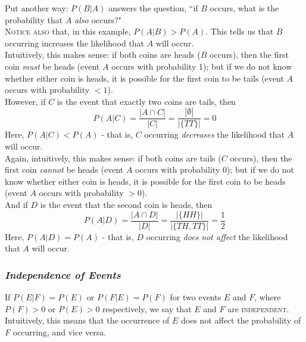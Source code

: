 \documentclass{article}
\begin{document}
Put another way: $P(B|A)$ answers the question, ``if $B$ occurs, what is the probability that $A$ \textit{also} occurs?"\\[1em]
\textsc{Notice also} that, in this example, $P(A|B)>P(A)$. This tells us that $B$ occurring increases the likelihood that $A$ will occur.\\
Intuitively, this makes sense: if both coins are heads ($B$ occurs), then the first coin \textit{must} be heads (event $A$ occurs with probability 1); but if we do not know whether either coin is heads, it is possible for the first coin to be tails (event $A$ occurs with probability $<1$).\\[1ex]
However, if $C$ is the event that exactly two coins are tails, then
\begin{equation*}
P(A|C)=\dfrac{|A\cap C|}{|C|}=\frac{|\emptyset|}{|\{TT\}|}=0
\end{equation*}
Here, $P(A|C)<P(A)$ - that is, $C$ occurring \textit{decreases} the likelihood that $A$ will occur.\\
Again, intuitively, this makes sense: if both coins are tails ($C$ occurs), then the first coin \textit{cannot} be heads (event $A$ occurs with probability 0); but if we do not know whether either coin is heads, it is possible for the first coin to be heads (event $A$ occurs with probability $>0$).\\[1ex]
And if $D$ is the event that the second coin is heads, then
\begin{equation*}
P(A|D)=\dfrac{|A\cap D|}{|D|}=\frac{|\{HH\}|}{|\{TH, TT\}|}=\dfrac{1}{2}
\end{equation*}
Here, $P(A|D)=P(A)$ - that is, $D$ occurring \textit{does not affect} the likelihood that $A$ will occur.

\subsubsection*{\em Independence of Events}
If $P(E|F)=P(E)$ or $P(F|E)=P(F)$ for two events $E$ and $F$, where $P(F)>0$ or $P(E)>0$ respectively, we say that $E$ and $F$ are \textsc{independent}. Intuitively, this means that the occurrence of $E$ does not affect the probability of $F$ occurring, and vice versa.
\end{document}

